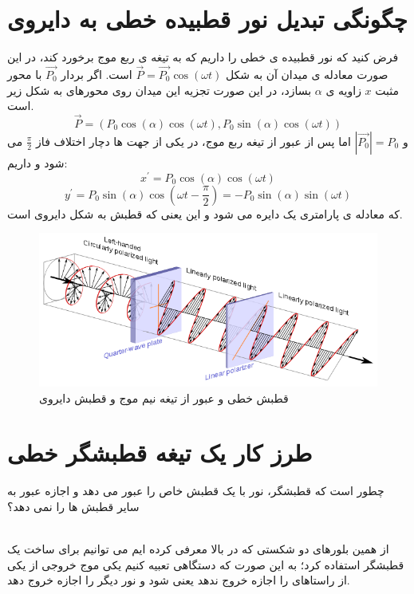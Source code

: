 \documentclass{article}
\begin{document}
\section{چگونگی تبدیل نور قطبیده خطی به دایروی}
فرض کنید که نور قطبیده ی خطی را داریم که به تیغه ی ربع موج برخورد کند، در این صورت معادله ی میدان آن به شکل 
$\vec{P} = \vec{P_0}\cos (\omega t)$ 
است. اگر بردار 
$\vec{P_0}$
با محور مثبت 
$x$
زاویه ی 
$\alpha$ بسازد، در این صورت تجزیه این میدان روی محورهای به شکل زیر است.
\[
\vec{P} = (P_0 \cos(\alpha)\cos (\omega t) ,P_0 \sin(\alpha)\cos (\omega t))
\]
و 
$|\vec{P_0}| = P_0$
اما پس از عبور از تیغه ربع موج، در یکی از جهت ها دچار اختلاف فاز 
$\frac{\pi}{2}$
می شود و داریم:
\[
x^{'} = P_0 \cos(\alpha)\cos (\omega t)
\]
\[
y^{'} = P_0 \sin(\alpha)\cos (\omega t - \frac{\pi}{2}) = - P_0 \sin(\alpha)\sin (\omega t)
\]
که معادله ی پارامتری یک دایره می شود و این یعنی که قطبش به شکل دایروی است.
\begin{figure}[h]
	\centering
	\includegraphics[width=\linewidth]{1.png}
	\caption{قطبش خطی و عبور از تیغه نیم موج و قطبش دایروی}
	\label{Fig1}
\end{figure}
\section{طرز کار یک تیغه قطبشگر خطی}
چطور است که قطبشگر، نور با یک قطبش خاص را عبور می دهد و اجازه عبور به سایر قطبش ها را نمی دهد؟

\noindent\\
از همین بلورهای دو شکستی که در بالا معرفی کرده ایم می توانیم برای ساخت یک قطبشگر استفاده کرد؛ به این صورت که دستگاهی تعبیه کنیم یکی موج خروجی از یکی از راستاهای را اجازه خروج ندهد یعنی 
 شود و نور دیگر را اجازه خروج دهد.
 
\end{document}
